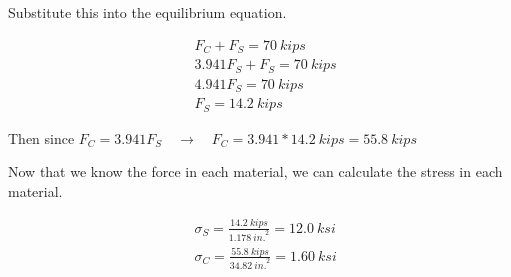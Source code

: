 \documentclass[
  letterpaper,
  DIV=11,
  numbers=noendperiod]{scrreprt}
\theoremstyle{definition}
\theoremstyle{remark}
\begin{document}
\begin{tcolorbox}
\begin{tcolorbox}
Substitute this into the equilibrium equation.

\[
\begin{aligned}
&F_C+F_S=70{~kips} \\
&3.941 F_S+F_S=70{~kips} \\
&4.941 F_S=70{~kips} \\
&F_S=14.2{~kips}
\end{aligned}
\]

Then since
\(F_C=3.941 F_S \quad\rightarrow\quad F_C=3.941 * 14.2{~kips}=55.8{~kips}\)

Now that we know the force in each material, we can calculate the stress
in each material.

\[
\begin{aligned}
& \sigma_S=\frac{14.2{~kips}}{1.178{~in.}^2}=12.0{~ksi} \\
& \sigma_C=\frac{55.8{~kips}}{34.82{~in.}^2}=1.60{~ksi}
\end{aligned}
\]

\end{tcolorbox}

\end{tcolorbox}
\end{document}
